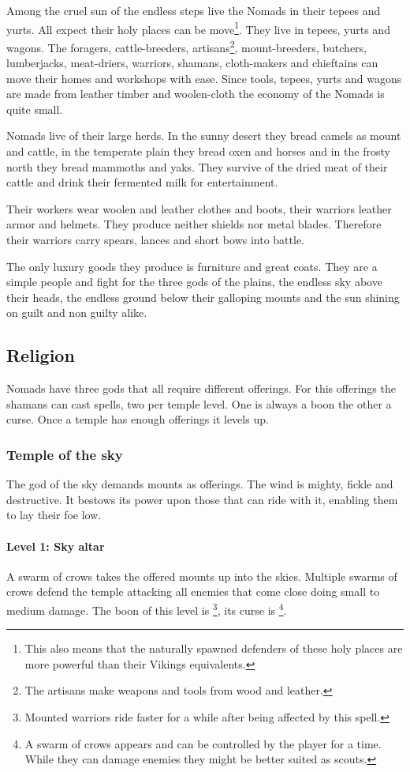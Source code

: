 \documentclass[a4paper]{book}
\begin{document}
	Among the cruel sun of the endless steps live the \gls{Nomads} in their tepees and yurts.
	All expect their holy places can be move\footnote{
		This also means that the naturally spawned defenders of these holy
		places are more powerful than their \gls{Vikings} equivalents.
	}.
	They live in tepees, yurts and wagons.
	The foragers, cattle-breeders, artisans\footnote{
		The artisans make weapons and tools from wood and leather.
	}, 
	mount-breeders, butchers, lumberjacks, meat-driers, warriors, shamans, cloth-makers 
	and chieftains can move their homes and workshops with ease.
	Since tools, tepees, yurts and wagons are made from leather timber and woolen-cloth
	the economy of the \gls{Nomads} is quite small.

	\Gls{Nomads} live of their large herds. In the sunny desert they bread camels as mount
	and cattle, in the temperate plain they bread oxen and horses and in the frosty north 
	they bread mammoths and yaks.
	They survive of the dried meat of their cattle and drink their fermented milk for
	entertainment.

	Their workers wear woolen and leather clothes and boots,
	their warriors leather armor and helmets.
	They produce neither shields nor metal blades.
	Therefore their warriors carry spears, lances and short bows into battle.

	The only luxury goods they produce is furniture and great coats.
	They are a simple people and fight for the three gods of the plains,
	the endless sky above their heads, the endless ground below their galloping
	mounts and the sun shining on guilt and non guilty alike.

	\subsection{Religion}
		\Gls{Nomads} have three gods that all require different offerings.
		For this offerings the shamans can cast spells, two per temple level.
		One is always a boon the other a curse.
		Once a temple has enough offerings it levels up.

		\subsubsection{Temple of the sky}
			The god of the sky demands mounts as offerings.
			The wind is mighty, fickle and destructive.
			It bestows its power upon those that can ride with it,
			enabling them to lay their foe low.

			\paragraph{Level 1: Sky altar}
				A swarm of crows takes the offered mounts up into the skies.
				Multiple swarms of crows defend the temple attacking all enemies that come
				close doing small to medium damage.
				The boon of this level is \footnote{
					Mounted warriors ride faster for a while after being affected
					by this spell.
				},
				its curse is \footnote{
					A swarm of crows appears and can be controlled by the player for a time.
					While they can damage enemies they might be better suited as scouts.
				}.
\end{document}
